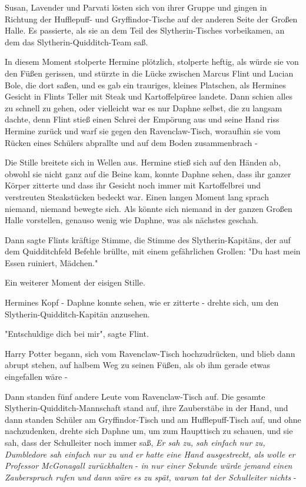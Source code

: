 {Susan, Lavender und Parvati lösten sich von ihrer Gruppe und gingen in Richtung der Hufflepuff- und Gryffindor-Tische auf der anderen Seite der Großen Halle. Es passierte, als sie an dem Teil des Slytherin-Tisches vorbeikamen, an dem das Slytherin-Quidditch-Team saß.

In diesem Moment stolperte Hermine plötzlich, stolperte heftig, als würde sie von den Füßen gerissen, und stürzte in die Lücke zwischen Marcus Flint und Lucian Bole, die dort saßen, und es gab ein trauriges, kleines Platschen, als Hermines Gesicht in Flints Teller mit Steak und Kartoffelpüree landete. Dann schien alles zu schnell zu gehen, oder vielleicht war es nur Daphne selbst, die zu langsam dachte, denn Flint stieß einen Schrei der Empörung aus und seine Hand riss Hermine zurück und warf sie gegen den Ravenclaw-Tisch, woraufhin sie vom Rücken eines Schülers abprallte und auf dem Boden zusammenbrach -

Die Stille breitete sich in Wellen aus. Hermine stieß sich auf den Händen ab, obwohl sie nicht ganz auf die Beine kam, konnte Daphne sehen, dass ihr ganzer Körper zitterte und dass ihr Gesicht noch immer mit Kartoffelbrei und verstreuten Steakstücken bedeckt war. Einen langen Moment lang sprach niemand, niemand bewegte sich. Als könnte sich niemand in der ganzen Großen Halle vorstellen, genauso wenig wie Daphne, was als nächstes geschah.

Dann sagte Flints kräftige Stimme, die Stimme des Slytherin-Kapitäns, der auf dem Quidditchfeld Befehle brüllte, mit einem gefährlichen Grollen: "Du hast mein Essen ruiniert, Mädchen."

Ein weiterer Moment der eisigen Stille.

Hermines Kopf - Daphne konnte sehen, wie er zitterte - drehte sich, um den Slytherin-Quidditch-Kapitän anzusehen.

"Entschuldige dich bei mir", sagte Flint.

Harry Potter begann, sich vom Ravenclaw-Tisch hochzudrücken, und blieb dann abrupt stehen, auf halbem Weg zu seinen Füßen, als ob ihm gerade etwas eingefallen wäre -

Dann standen fünf andere Leute vom Ravenclaw-Tisch auf. Die gesamte Slytherin-Quidditch-Mannschaft stand auf, ihre Zauberstäbe in der Hand, und dann standen Schüler am Gryffindor-Tisch und am Hufflepuff-Tisch auf, und ohne nachzudenken, drehte sich Daphne um, um zum Haupttisch zu schauen, und sie sah, dass der Schulleiter noch immer saß, \emph{Er sah zu, sah einfach nur zu, Dumbledore sah einfach nur zu und er hatte eine Hand ausgestreckt, als wolle er Professor McGonagall zurückhalten} - \emph{in nur einer Sekunde würde jemand einen Zauberspruch rufen und dann wäre es zu spät, warum tat der Schulleiter nichts} -

}
